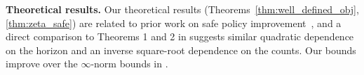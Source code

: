 \textbf{Theoretical results.} 
Our theoretical results (Theorems~\ref{thm:well_defined_obj}, \ref{thm:zeta_safe}) are related to prior work on safe policy improvement~\citep{laroche2017safe,ghavamzadeh2016safe}, and a direct comparison to Theorems 1 and 2 in \citet{laroche2017safe} suggests similar quadratic dependence on the horizon and an inverse square-root dependence on the counts. Our bounds improve over the $\infty$-norm bounds in \citet{ghavamzadeh2016safe}. 

